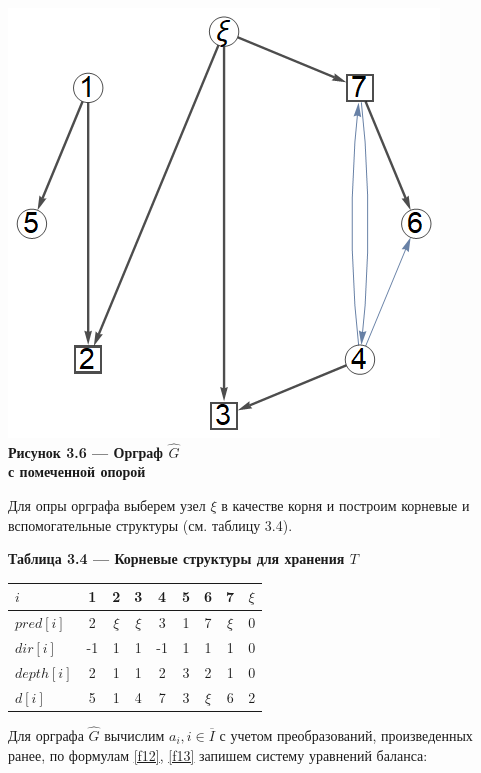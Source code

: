 \documentclass[14pt]{extarticle}%
\begin{document}
\begin{center}
\includegraphics[scale=0.6]{grs/s2ghat.png}\\
\textbf{Рисунок 3.6 --- Орграф $\widehat{G}$ \\с помеченной опорой}
\end{center}

Для опры орграфа выберем узел $\xi$ в качестве корня и построим корневые и вспомогательные структуры (см. таблицу 3.4).

\begin{center}
\textbf{Таблица 3.4 --- Корневые структуры для хранения $T$}\\
\begin{tabular}{l|cccccccc}
  $i$&1&2&3&4&5&6&7&$\xi$\\\hline
 $pred[i]$&2 & $\xi$ & $\xi$ & 3 & 1 & 7 & $\xi$ & 0 \\
 $dir[i]$& -1 & 1 & 1 & -1 & 1 & 1 & 1 & 0 \\
 $depth[i]$&2 & 1 & 1 & 2 & 3 & 2 & 1 & 0 \\
 $d[i]$&5 & 1 & 4 & 7 & 3 & $\xi$ & 6 & 2 \\
\end{tabular}
\end{center}

Для орграфа $\widehat{G}$ вычислим $a_i, i\in \overline{I}$ с учетом преобразований, произведенных ранее, по формулам \eqref{f12}, \eqref{f13} запишем систему уравнений баланса:
\end{document}

